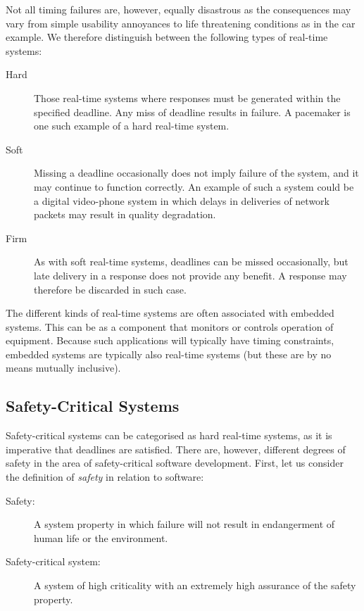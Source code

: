 Not all timing failures are, however, equally disastrous as the consequences may vary from simple usability annoyances to life threatening conditions as in the car example. We therefore distinguish between the following types of real-time systems:
\begin{description}
\item[Hard] Those real-time systems where responses must be generated within the specified deadline. Any miss of deadline results in failure. A pacemaker is one such example of a hard real-time system.
\item[Soft] Missing a deadline occasionally does not imply failure of the system, and it may continue to function correctly. An example of such a system could be a digital video-phone system in which delays in deliveries of network packets may result in quality degradation.
\item[Firm] As with soft real-time systems, deadlines can be missed occasionally, but late delivery in a response does not provide any benefit. A response may therefore be discarded in such case.
\end{description}

The different kinds of real-time systems are often associated with embedded systems. This can be as a component that monitors or controls operation of equipment. Because such applications will typically have timing constraints, embedded systems are typically also real-time systems (but these are by no means mutually inclusive).

\subsection{Safety-Critical Systems} %
\label{sub:safety_critical_systems}
Safety-critical systems can be categorised as hard real-time systems, as it is imperative that deadlines are satisfied. There are, however, different degrees of safety in the area of safety-critical software development. First, let us consider the definition of \textit{safety} in relation to software\cite{SCJSpec}:
\begin{description}
	\item[Safety:] A system property in which failure will not result in endangerment of human life or the environment.
	\item[Safety-critical system:] A system of high criticality with an extremely high assurance of the safety property.
\end{description}

